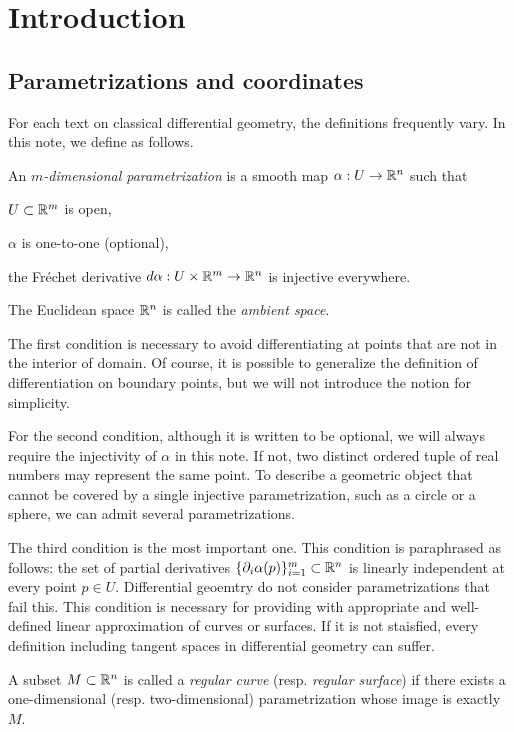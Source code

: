 \documentclass{../exp}
\def\a{\alpha}
\begin{document}
\clearpage
\section{Introduction}
\subsection{Parametrizations and coordinates}
For each text on classical differential geometry, the definitions frequently vary.
In this note, we define as follows.
\begin{defn}
An \emph{$m$-dimensional parametrization} is a smooth map $\a:U\to\R^n$ such that
\begin{cond}
\item $U\subset\mathbb{R}^m$ is open,
\item $\a$ is one-to-one (optional),
\item the Fr\'echet derivative $d\a:U\times\R^m\to\R^n$ is injective everywhere.
\end{cond}
The Euclidean space $\mathbb{R}^n$ is called the \emph{ambient space}.
\end{defn}

The first condition is necessary to avoid differentiating at points that are not in the interior of domain.
Of course, it is possible to generalize the definition of differentiation on boundary points, but we will not introduce the notion for simplicity.

For the second condition, although it is written to be optional, we will always require the injectivity of $\a$ in this note.
If not, two distinct ordered tuple of real numbers may represent the same point.
To describe a geometric object that cannot be covered by a single injective parametrization, such as a circle or a sphere, we can admit several parametrizations.

The third condition is the most important one.
This condition is paraphrased as follows: the set of partial derivatives $\{\pd_i\a(p)\}_{i=1}^m\subset\R^n$ is linearly independent at every point $p\in U$.
Differential geoemtry do not consider parametrizations that fail this.
This condition is necessary for providing with appropriate and well-defined linear approximation of curves or surfaces.
If it is not staisfied, every definition including tangent spaces in differential geometry can suffer.

\begin{defn}
A subset $M\subset\mathbb{R}^n$ is called a \emph{regular curve} (resp. \emph{regular surface}) if there exists a one-dimensional (resp. two-dimensional) parametrization whose image is exactly $M$.
\end{defn}
\end{document}
